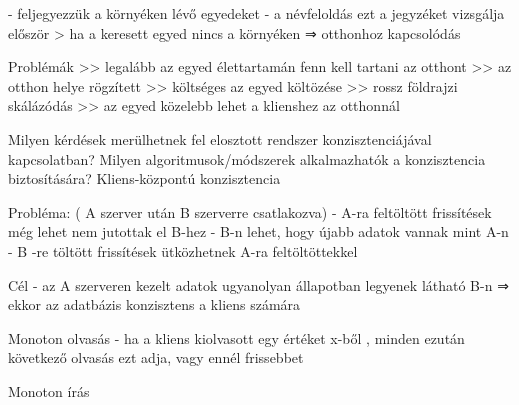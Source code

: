 \documentclass[12pt]{article}
\begin{document}
\begin{description}
                                                                        - feljegyezzük a környéken lévő egyedeket
                                                                        - a névfeloldás ezt a jegyzéket vizsgálja először
                                                                        > ha a keresett egyed nincs a környéken ⇒ otthonhoz kapcsolódás
                                                                    \item Problémák
                                                                        >> legalább az egyed élettartamán fenn kell tartani az otthont
                                                                        >> az otthon helye rögzített >> költséges az egyed költözése
                                                                        >> rossz földrajzi skálázódás
                                                                        >> az egyed közelebb lehet a klienshez az otthonnál
                                                                    \item  Milyen kérdések merülhetnek fel elosztott rendszer konzisztenciájával kapcsolatban? Milyen algoritmusok/módszerek alkalmazhatók a konzisztencia biztosítására? 
                                                                        Kliens-központú konzisztencia
                                                                    \item Probléma: ( A szerver után B szerverre csatlakozva)
                                                                        - A-ra feltöltött frissítések még lehet nem jutottak el B-hez
                                                                        - B-n lehet, hogy újabb adatok vannak mint A-n
                                                                        - B -re töltött frissítések ütközhetnek A-ra feltöltöttekkel
                                                                    \item Cél
                                                                        - az A szerveren kezelt adatok ugyanolyan állapotban legyenek látható B-n ⇒ ekkor az adatbázis konzisztens a kliens számára
                                                                    \item Monoton olvasás
                                                                        - ha a kliens kiolvasott egy értéket x-ből , minden ezután következő olvasás ezt adja, vagy ennél frissebbet
                                                                    \item Monoton írás

\end{description}
\end{document}
